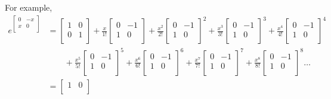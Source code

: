 \documentclass[10pt]{article}
\begin{document}
For example,
\begin{align}
\nonumber e^{\begin{bmatrix}
    0 & -x \\
    x & 0 \\
  \end{bmatrix}}&=\begin{bmatrix}
    1 & 0 \\
    0 & 1 \\
  \end{bmatrix}+\frac{x}{1!}\begin{bmatrix}
    0 & -1 \\
    1 & 0 \\
  \end{bmatrix}+\frac{x^2}{2!}\begin{bmatrix}
    0 & -1 \\
    1 & 0 \\
  \end{bmatrix}^2+\frac{x^3}{3!}\begin{bmatrix}
    0 & -1 \\
    1 & 0 \\
  \end{bmatrix}^3+\frac{x^4}{4!}\begin{bmatrix}
    0 & -1 \\
    1 & 0 \\
  \end{bmatrix}^4\\\nonumber
&\qquad+\frac{x^5}{5!}\begin{bmatrix}
    0 & -1 \\
    1 & 0 \\
  \end{bmatrix}^5+\frac{x^6}{6!}\begin{bmatrix}
    0 & -1 \\
    1 & 0 \\
  \end{bmatrix}^6+\frac{x^7}{7!}\begin{bmatrix}
    0 & -1 \\
    1 & 0 \\
  \end{bmatrix}^7+\frac{x^8}{8!}\begin{bmatrix}
    0 & -1 \\
    1 & 0 \\
  \end{bmatrix}^8\ldots\\\nonumber
&=\begin{bmatrix}
    1 & 0 \\

\end{bmatrix}
\end{align}
\end{document}
